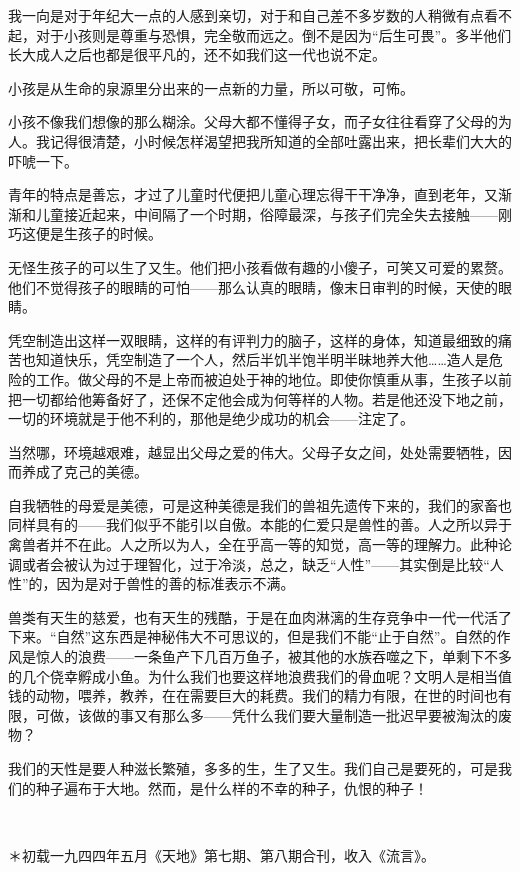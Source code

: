 \par 我一向是对于年纪大一点的人感到亲切，对于和自己差不多岁数的人稍微有点看不起，对于小孩则是尊重与恐惧，完全敬而远之。倒不是因为“后生可畏”。多半他们长大成人之后也都是很平凡的，还不如我们这一代也说不定。
\par 小孩是从生命的泉源里分出来的一点新的力量，所以可敬，可怖。
\par 小孩不像我们想像的那么糊涂。父母大都不懂得子女，而子女往往看穿了父母的为人。我记得很清楚，小时候怎样渴望把我所知道的全部吐露出来，把长辈们大大的吓唬一下。
\par 青年的特点是善忘，才过了儿童时代便把儿童心理忘得干干净净，直到老年，又渐渐和儿童接近起来，中间隔了一个时期，俗障最深，与孩子们完全失去接触——刚巧这便是生孩子的时候。
\par 无怪生孩子的可以生了又生。他们把小孩看做有趣的小傻子，可笑又可爱的累赘。他们不觉得孩子的眼睛的可怕——那么认真的眼睛，像末日审判的时候，天使的眼睛。
\par 凭空制造出这样一双眼睛，这样的有评判力的脑子，这样的身体，知道最细致的痛苦也知道快乐，凭空制造了一个人，然后半饥半饱半明半昧地养大他……造人是危险的工作。做父母的不是上帝而被迫处于神的地位。即使你慎重从事，生孩子以前把一切都给他筹备好了，还保不定他会成为何等样的人物。若是他还没下地之前，一切的环境就是于他不利的，那他是绝少成功的机会——注定了。
\par 当然哪，环境越艰难，越显出父母之爱的伟大。父母子女之间，处处需要牺牲，因而养成了克己的美德。
\par 自我牺牲的母爱是美德，可是这种美德是我们的兽祖先遗传下来的，我们的家畜也同样具有的——我们似乎不能引以自傲。本能的仁爱只是兽性的善。人之所以异于禽兽者并不在此。人之所以为人，全在乎高一等的知觉，高一等的理解力。此种论调或者会被认为过于理智化，过于冷淡，总之，缺乏“人性”——其实倒是比较“人性”的，因为是对于兽性的善的标准表示不满。
\par 兽类有天生的慈爱，也有天生的残酷，于是在血肉淋漓的生存竞争中一代一代活了下来。“自然”这东西是神秘伟大不可思议的，但是我们不能“止于自然”。自然的作风是惊人的浪费——一条鱼产下几百万鱼子，被其他的水族吞噬之下，单剩下不多的几个侥幸孵成小鱼。为什么我们也要这样地浪费我们的骨血呢？文明人是相当值钱的动物，喂养，教养，在在需要巨大的耗费。我们的精力有限，在世的时间也有限，可做，该做的事又有那么多——凭什么我们要大量制造一批迟早要被淘汰的废物？
\par 我们的天性是要人种滋长繁殖，多多的生，生了又生。我们自己是要死的，可是我们的种子遍布于大地。然而，是什么样的不幸的种子，仇恨的种子！
\par  
\par ＊初载一九四四年五月《天地》第七期、第八期合刊，收入《流言》。


